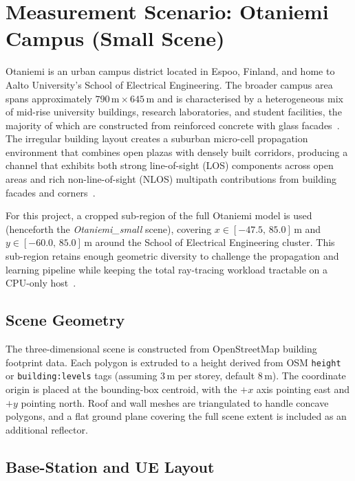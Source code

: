 \section{Measurement Scenario: Otaniemi Campus (Small Scene)}
\label{sec:otaniemi}

Otaniemi is an urban campus district located in Espoo, Finland, and home to
Aalto University's School of Electrical Engineering.
The broader campus area spans approximately $790\,\text{m}\times 645\,\text{m}$
and is characterised by a heterogeneous mix of mid-rise university buildings,
research laboratories, and student facilities, the majority of which are
constructed from reinforced concrete with glass
facades~\cite{itu_p2040}.
The irregular building layout creates a suburban micro-cell propagation
environment that combines open plazas with densely built corridors, producing
a channel that exhibits both strong line-of-sight (LOS) components across open
areas and rich non-line-of-sight (NLOS) multipath contributions from building
facades and corners~\cite{rappaport2013millimeter}.

For this project, a cropped sub-region of the full Otaniemi model is used
(henceforth the \emph{Otaniemi\_small} scene), covering
$x\in[-47.5,\,85.0]\,\text{m}$ and $y\in[-60.0,\,85.0]\,\text{m}$ around the
School of Electrical Engineering cluster.
This sub-region retains enough geometric diversity to challenge the
propagation and learning pipeline while keeping the total ray-tracing workload
tractable on a CPU-only host~\cite{hoydis2023sionna_rt,jakob2022mitsuba3}.

\subsection{Scene Geometry}

The three-dimensional scene is constructed from OpenStreetMap building
footprint data. Each polygon is extruded to a height derived from OSM
\texttt{height} or \texttt{building:levels} tags (assuming $3\,\text{m}$ per
storey, default $8\,\text{m}$). The coordinate origin is placed at the
bounding-box centroid, with the $+x$ axis pointing east and $+y$ pointing
north. Roof and wall meshes are triangulated to handle concave polygons, and
a flat ground plane covering the full scene extent is included as an
additional reflector.

\subsection{Base-Station and UE Layout}
\label{sec:scene_layout}

